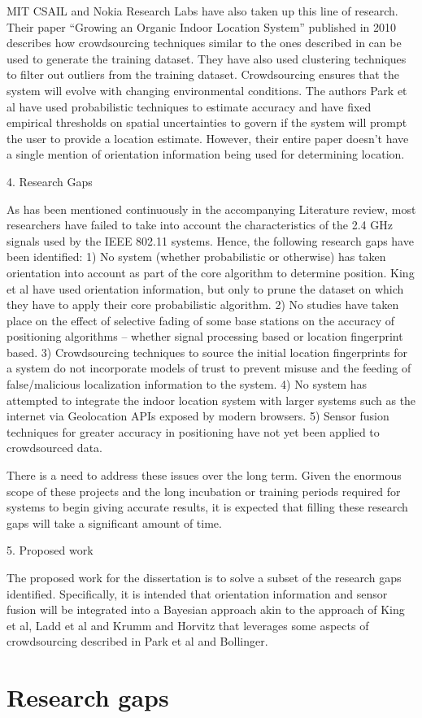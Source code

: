 MIT CSAIL and Nokia Research Labs have also taken up this line of research. Their paper “Growing an Organic Indoor Location System” published in 2010 describes how crowdsourcing techniques similar to the ones described in  can be used to generate the training dataset. They have also used clustering techniques to filter out outliers from the training dataset. Crowdsourcing ensures that the system will evolve with changing environmental conditions. The authors Park et al have used probabilistic techniques to estimate accuracy and have fixed empirical thresholds on spatial uncertainties to govern if the system will prompt the user to provide a location estimate. However, their entire paper doesn’t have a single mention of orientation information being used for determining location. 

4. Research Gaps

As has been mentioned continuously in the accompanying Literature review, most researchers have failed to take into account the characteristics of the 2.4 GHz signals used by the IEEE 802.11 systems. Hence, the following research gaps have been identified:
1) No system (whether probabilistic or otherwise) has taken orientation into account as part of the core algorithm to determine position. King et al  have used orientation information, but only to prune the dataset on which they have to apply their core probabilistic algorithm.
2) No studies have taken place on the effect of selective fading of some base stations on the accuracy of positioning algorithms – whether signal processing based or location fingerprint based.
3) Crowdsourcing techniques to source the initial location fingerprints for a system do not incorporate models of trust to prevent misuse and the feeding of false/malicious localization information to the system.
4) No system has attempted to integrate the indoor location system with larger systems such as the internet via Geolocation APIs exposed by modern browsers.
5) Sensor fusion techniques for greater accuracy in positioning have not yet been applied to crowdsourced data.

There is a need to address these issues over the long term. Given the enormous scope of these projects and the long incubation or training periods required for systems to begin giving accurate results, it is expected that filling these research gaps will take a significant amount of time.

5. Proposed work 

The proposed work for the dissertation is to solve a subset of the research gaps identified. Specifically, it is intended that orientation information and sensor fusion will be integrated into a Bayesian approach akin to the approach of King et al, Ladd et al  and Krumm and Horvitz  that leverages some aspects of crowdsourcing described in Park et al  and Bollinger. 

\section{Research gaps}

